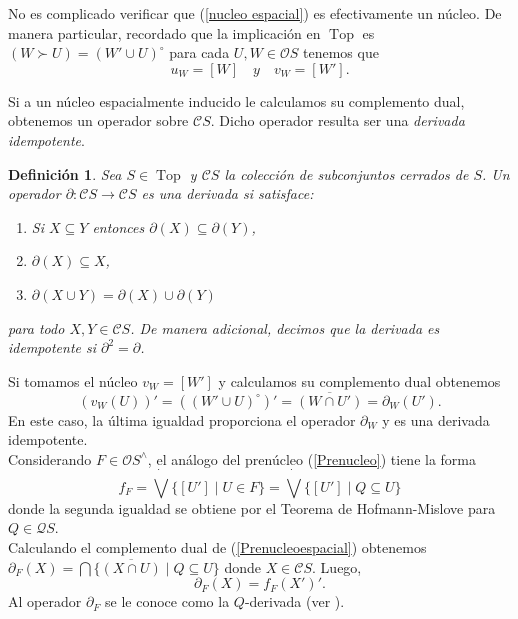 \documentclass[12pt]{article}
\newtheorem{dfn}[thm]{Definición}
\DeclareMathOperator{\Top}{Top}
\begin{document}
No es complicado verificar que (\ref{nucleo espacial}) es efectivamente un núcleo. De manera particular, 
recordado que la implicación en $\Top$ es $(W\succ U)=(W'\cup U)^\circ$ para cada $U, W\in \mathcal{O}S$ tenemos que 
\[
u_W=[W]\quad y \quad v_W=[W'].
\] 

Si a un núcleo espacialmente inducido le calculamos su complemento dual, obtenemos un operador sobre $\mathcal{C}S$. Dicho operador resulta ser una \emph{derivada idempotente}.

\begin{dfn}\label{derivadaidempotente}
Sea $S\in \Top$ y $\mathcal{C}S$ la colección de subconjuntos cerrados de $S$. Un operador $\partial\colon \mathcal{C}S\to \mathcal{C}S$ es una derivada si satisface:
\begin{enumerate}
\item Si $X\subseteq Y$ entonces $\partial(X)\subseteq \partial(Y)$,
\item $\partial(X)\subseteq X$,
\item $\partial(X\cup Y)=\partial(X)\cup \partial(Y)$
\end{enumerate}
para todo $X,Y\in \mathcal{C}S$. De manera adicional, decimos que la derivada es idempotente si $\partial^2=\partial$.
\end{dfn}

Si tomamos el núcleo $v_W=[W']$ y calculamos su complemento dual obtenemos
\begin{equation}\label{eq:derivada}
(v_{W}(U))'=((W'\cup U)^{\circ})'=\overline{(W\cap U')}=\partial_{W}(U').
\end{equation}
En este caso, la última igualdad proporciona el operador $\partial_{W}$ y es una derivada idempotente.\\

Considerando $F\in \mathcal{O}S^\wedge$, el análogo del prenúcleo (\ref{Prenucleo}) tiene la forma
\begin{equation}\label{Prenucleoespacial}
f_F=\dot{\bigvee}\{[U']\mid U\in F\}=\dot{\bigvee}\{[U']\mid Q\subseteq U\}
\end{equation}
donde la segunda igualdad se obtiene por el Teorema de Hofmann-Mislove para $Q\in \mathcal{Q}S$.\\ 

Calculando el complemento dual de (\ref{Prenucleoespacial}) obtenemos $\partial_F(X)=\bigcap\{\overline{(X\cap U)}\mid Q\subseteq U\}$
donde $X\in \mathcal{C}S$. Luego, 
\begin{equation}\label{eq:complementodual}
\partial_F(X)=f_F(X')'.
\end{equation} 
Al operador $\partial_F$ se le conoce como la $Q$-derivada (ver \cite[Lema 6.1]{simmons2004vietoris}).\\
\end{document}
